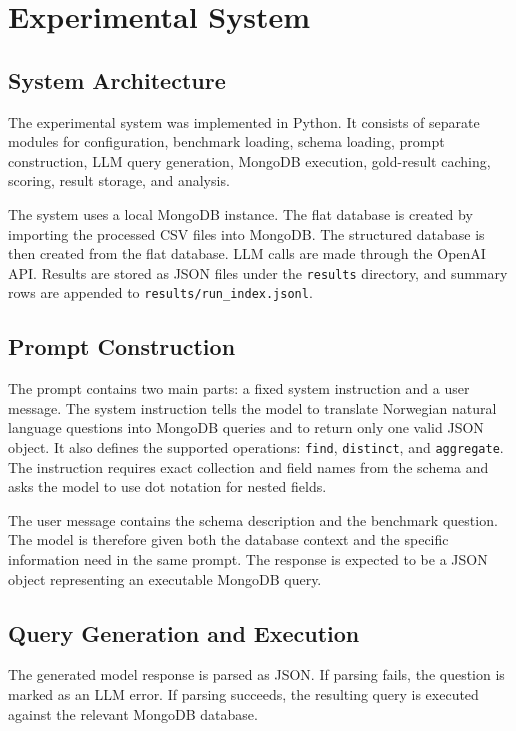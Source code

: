 \section{Experimental System}

\subsection{System Architecture}

The experimental system was implemented in Python. It consists of separate modules for configuration, benchmark loading, schema loading, prompt construction, LLM query generation, MongoDB execution, gold-result caching, scoring, result storage, and analysis.

The system uses a local MongoDB instance. The flat database is created by importing the processed CSV files into MongoDB. The structured database is then created from the flat database. LLM calls are made through the OpenAI API. Results are stored as JSON files under the \texttt{results} directory, and summary rows are appended to \texttt{results/run\_index.jsonl}.

\subsection{Prompt Construction}

The prompt contains two main parts: a fixed system instruction and a user message. The system instruction tells the model to translate Norwegian natural language questions into MongoDB queries and to return only one valid JSON object. It also defines the supported operations: \texttt{find}, \texttt{distinct}, and \texttt{aggregate}. The instruction requires exact collection and field names from the schema and asks the model to use dot notation for nested fields.

The user message contains the schema description and the benchmark question. The model is therefore given both the database context and the specific information need in the same prompt. The response is expected to be a JSON object representing an executable MongoDB query.

\subsection{Query Generation and Execution}

The generated model response is parsed as JSON. If parsing fails, the question is marked as an LLM error. If parsing succeeds, the resulting query is executed against the relevant MongoDB database.

